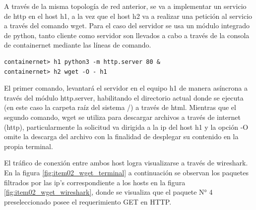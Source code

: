 \documentclass[10pt]{article}
\begin{document}
\begin{multicols}{2}

\noindent
A través de la misma topología de red anterior, se va a implementar un servicio de http en el host h1, a la vez que el host h2 va a realizar una petición al servicio a través del comando wget. Para el caso del servidor se usa un módulo integrado de python, tanto cliente como servidor son llevados a cabo a través de la consola de containernet mediante las líneas de comando.\newline

\begin{verbatim}
containernet> h1 python3 -m http.server 80 &
containernet> h2 wget -O - h1
\end{verbatim}

\noindent
El primer comando, levantará el servidor en el equipo h1 de manera asíncrona a través del módulo http.server, habilitando el directorio actual donde se ejecuta (en este caso la carpeta raíz del sistema /) a través de html. Mientras que el segundo comando, wget se utiliza para descargar archivos a través de internet (http), particularmente la solicitud va dirigida a la ip del host h1 y la opción -O omite la descarga del archivo con la finalidad de desplegar su contenido en la propia terminal. \newline

\noindent
El tráfico de conexión entre ambos host logra visualizarse a través de wireshark. En la figura \ref{fig:item02_wget_terminal} a continuación se observan los paquetes filtrados por las ip’s correspondiente a los hosts en la figura \ref{fig:item02_wget_wireshark}, donde se visualiza que el paquete N° 4 preseleccionado posee el requerimiento GET en HTTP. \newline

\columnbreak


\end{multicols}
\end{document}
